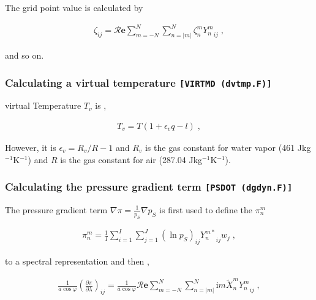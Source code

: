 The grid point value is calculated by

\begin{eqnarray}
  \zeta_{ij}
   =  {\mathcal R}{\mathbf{e}} \sum_{m=-N}^{N} \sum_{n=|m|}^{N}
      \zeta_n^m  {Y_n^m}_{ij} \; ,
\end{eqnarray}

and so on.

\hypertarget{calculating-a-virtual-temperature-virtmd-dvtmp.f}{%
\subsubsection{\texorpdfstring{Calculating a virtual temperature
\texttt{{[}VIRTMD\ (dvtmp.F){]}}}{Calculating a virtual temperature {[}VIRTMD (dvtmp.F){]}}}\label{calculating-a-virtual-temperature-virtmd-dvtmp.f}}

virtual Temperature \(T_v\) is ,

\begin{eqnarray}
  T_v = T ( 1 + \epsilon_v q - l ) \; ,
\end{eqnarray}

However, it is \(\epsilon_v = R_v/R - 1\) and \(R_v\) is the gas
constant for water vapor (461 Jkg\(^{-1}\)K\(^{-1}\)) and \(R\) is the
gas constant for air (287.04 Jkg\(^{-1}\)K\(^{-1}\)).

\hypertarget{calculating-the-pressure-gradient-term-psdot-dgdyn.f}{%
\subsubsection{\texorpdfstring{Calculating the pressure gradient term
\texttt{{[}PSDOT\ (dgdyn.F){]}}}{Calculating the pressure gradient term {[}PSDOT (dgdyn.F){]}}}\label{calculating-the-pressure-gradient-term-psdot-dgdyn.f}}

The pressure gradient term \(\nabla \pi = \frac{1}{p_S} \nabla p_S\) is
first used to define the \(\pi_n^m\)

\begin{eqnarray}
  \pi_n^m  =  \frac{1}{I} \sum_{i=1}^{I} \sum_{j=1}^{J}  
               (\ln {p_S})_{ij} {Y_n^{m *}}_{ij}  w_j \; ,
\end{eqnarray}

to a spectral representation and then ,

\begin{eqnarray}
   \frac{1}{a \cos \varphi}
   \left( \frac{\partial \pi}{\partial \lambda} \right)_{ij}
     =
   \frac{1}{a \cos \varphi}
        {\mathcal R}{\mathbf{e}} \sum_{m=-N}^{N} \sum_{n=|m|}^{N}
       \mathrm{i}m \tilde{X}_n^m {Y_n^m}_{ij}  \; ,
\end{eqnarray}

